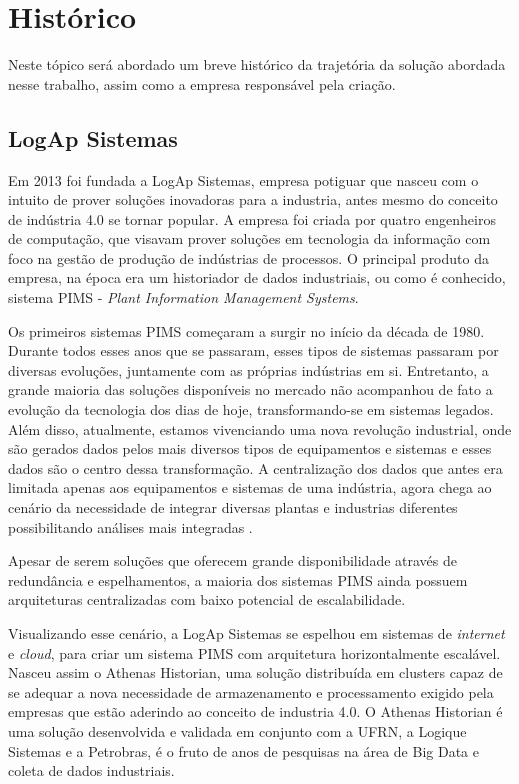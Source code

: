 \section{Histórico}
\label{Sec:historico}

Neste tópico será abordado um breve histórico da trajetória da solução abordada nesse trabalho, assim como a empresa responsável pela criação.


\subsection{LogAp Sistemas}
\label{Sec:logapSistemas}

Em 2013 foi fundada a LogAp Sistemas, empresa potiguar que nasceu com o intuito de prover soluções inovadoras para a industria, antes mesmo do conceito de indústria 4.0 se tornar popular. A empresa foi criada por quatro engenheiros de computação, que visavam prover soluções em tecnologia da informação com foco na gestão de produção de indústrias de processos. O principal produto da empresa, na época era um historiador de dados industriais, ou como é conhecido, sistema PIMS - \textit{Plant Information Management Systems}.

Os primeiros sistemas PIMS começaram a surgir no início da década de 1980. Durante todos esses anos que se passaram, esses tipos de sistemas passaram por diversas evoluções, juntamente com as próprias indústrias em si. Entretanto, a grande maioria das soluções disponíveis no mercado não acompanhou de fato a evolução da tecnologia dos dias de hoje, transformando-se em sistemas legados. Além disso, atualmente, estamos vivenciando uma nova revolução industrial, onde são gerados dados pelos mais diversos tipos de equipamentos e sistemas e esses dados são o centro dessa transformação. A centralização dos dados que antes era limitada apenas aos equipamentos e sistemas de uma indústria, agora chega ao cenário da necessidade de integrar diversas plantas e industrias diferentes possibilitando análises mais integradas \cite{gerencia-processo-automacao}.

Apesar de serem soluções que oferecem grande disponibilidade através de redundância e espelhamentos, a maioria dos sistemas PIMS ainda possuem arquiteturas centralizadas com baixo potencial de escalabilidade. 

Visualizando esse cenário, a LogAp Sistemas se espelhou em sistemas de \textit{internet} e \textit{cloud}, para criar um sistema PIMS com arquitetura horizontalmente escalável. Nasceu assim o Athenas Historian, uma solução distribuída em clusters capaz de se adequar a nova necessidade de armazenamento e processamento exigido pela empresas que estão aderindo ao conceito de industria 4.0. O Athenas Historian é uma solução desenvolvida e validada em conjunto com a UFRN, a Logique Sistemas e a Petrobras, é o fruto de anos de pesquisas na área de Big Data e coleta de dados industriais.

